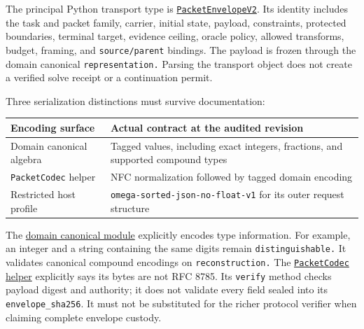 \documentclass[
  11pt,
]{article}
\newcommand{\passthrough}[1]{#1}
\begin{document}
The principal Python transport type is
\href{https://github.com/dbccpage/the_symbol_game/blob/52cb5457f6c485ba548cfd292f6012a941ed22cf/omega_engine_pfp/domain/entities/packet_envelope.py}{\nolinkurl{PacketEnvelopeV2}}.
Its identity includes the task and packet family, carrier, initial
state, payload, constraints, protected boundaries, terminal target,
evidence ceiling, oracle policy, allowed transforms, budget, framing,
and \nolinkurl{source/parent} bindings. The payload is frozen through
the domain canonical \nolinkurl{representation.} Parsing the transport
object does not create a verified solve receipt or a continuation
permit.

Three serialization distinctions must survive documentation:

\begin{longtable}[]{@{}
  >{\raggedright\arraybackslash}p{}
  >{\raggedright\arraybackslash}p{}@{}}
\toprule\noalign{}
\begin{minipage}[b]{\linewidth}\raggedright
Encoding surface
\end{minipage} & \begin{minipage}[b]{\linewidth}\raggedright
Actual contract at the audited revision
\end{minipage} \\
\midrule\noalign{}
\endhead
\bottomrule\noalign{}
\endlastfoot
Domain canonical algebra & Tagged values, including exact integers,
fractions, and supported compound types \\
\passthrough{\lstinline!PacketCodec!} helper & NFC normalization
followed by tagged domain encoding \\
Restricted host profile & \nolinkurl{omega-sorted-json-no-float-v1} for
its outer request structure \\
\end{longtable}

The
\href{https://github.com/dbccpage/the_symbol_game/blob/52cb5457f6c485ba548cfd292f6012a941ed22cf/omega_engine_pfp/domain/shared_kernel/canonical.py}{domain
canonical module} explicitly encodes type information. For example, an
integer and a string containing the same digits remain
\nolinkurl{distinguishable.} It validates canonical compound encodings
on \nolinkurl{reconstruction.} The
\href{https://github.com/dbccpage/the_symbol_game/blob/52cb5457f6c485ba548cfd292f6012a941ed22cf/omega_engine_pfp/domain/packet_codec.py}{\passthrough{\lstinline!PacketCodec!}
helper} explicitly says its bytes are not RFC 8785. Its
\passthrough{\lstinline!verify!} method checks payload digest and
authority; it does not validate every field sealed into its
\nolinkurl{envelope_sha256}. It must not be substituted for the richer
protocol verifier when claiming complete envelope custody.
\end{document}
